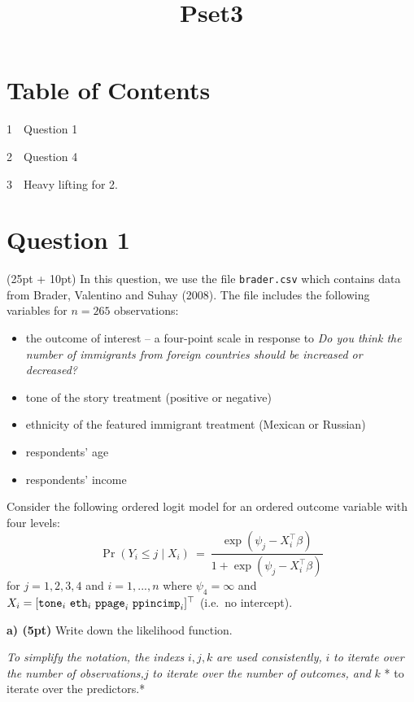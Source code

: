 \documentclass{article}
\title{Pset3}
\providecommand{\tightlist}{%
      \setlength{\itemsep}{0pt}\setlength{\parskip}{0pt}}
\begin{document}
    
    
    \maketitle
    
    

    
    \section{Table of Contents}\label{table-of-contents}

{1~~}Question 1

{2~~}Question 4

{3~~}Heavy lifting for 2.

    \section{Question 1}\label{question-1}

(25pt + 10pt) In this question, we use the file \texttt{brader.csv}
which contains data from Brader, Valentino and Suhay (2008). The file
includes the following variables for \(n=265\) observations:

\begin{itemize}
\tightlist
\item
  the outcome of interest -- a four-point scale in response to \emph{Do
  you think the number of immigrants from foreign countries should be
  increased or decreased?}
\item
  tone of the story treatment (positive or negative)
\item
  ethnicity of the featured immigrant treatment (Mexican or Russian)
\item
  respondents' age
\item
  respondents' income
\end{itemize}

Consider the following ordered logit model for an ordered outcome
variable with four levels:
\[ \Pr(Y_i \leq j \mid X_i) \ = \ \frac{\exp(\psi_j - X_i^\top\beta)}
            {1 + \exp(\psi_j - X_i^\top\beta)} \] for \(j = 1,2,3,4\)
and \(i = 1,...,n\) where \(\psi_4=\infty\) and
\(X_i = [{\tt tone}_i \ {\tt eth}_i \ {\tt ppage}_i \ {\tt ppincimp}_i]^\top\)
(i.e.~no intercept).

    \textbf{a) (5pt)} Write down the likelihood function.

    \emph{To simplify the notation, the indexs} \(i,j,k\) \emph{are used
consistently,} \(i\) \emph{to iterate over the number of
observations,}\(j\) \emph{to iterate over the number of outcomes, and}
\(k\) * to iterate over the predictors.*
\end{document}
